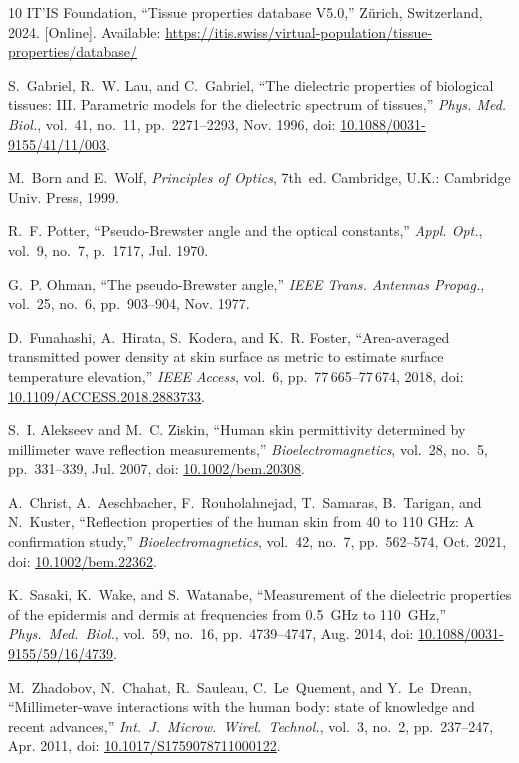 \documentclass[journal,twocolumn,10pt]{IEEEtran}
\newcommand*{\doi}[1]{\href{https://doi.org/#1}{#1}}
\theoremstyle{plain}
\theoremstyle{remark}
\begin{document}
\begin{thebibliography}{10}
IT'IS Foundation, ``Tissue properties database V5.0,'' Z\"urich,
  Switzerland, 2024. [Online]. Available:
  \url{https://itis.swiss/virtual-population/tissue-properties/database/}

S.~Gabriel, R.~W. Lau, and C.~Gabriel, ``The dielectric properties of
  biological tissues: III. Parametric models for the dielectric spectrum
  of tissues,'' \emph{Phys. Med. Biol.}, vol.~41, no.~11,
  pp.~2271--2293, Nov. 1996, doi: \doi{10.1088/0031-9155/41/11/003}.

M.~Born and E.~Wolf, \emph{Principles of Optics}, 7th~ed.
  Cambridge, U.K.: Cambridge Univ. Press, 1999.

R.~F. Potter, ``Pseudo-Brewster angle and the optical constants,''
  \emph{Appl. Opt.}, vol.~9, no.~7, p.~1717, Jul. 1970.

G.~P. Ohman, ``The pseudo-Brewster angle,'' \emph{IEEE Trans. Antennas
  Propag.}, vol.~25, no.~6, pp.~903--904, Nov. 1977.

D.~Funahashi, A.~Hirata, S.~Kodera, and K.~R. Foster, ``Area-averaged
  transmitted power density at skin surface as metric to estimate
  surface temperature elevation,'' \emph{IEEE Access}, vol.~6,
  pp.~77\,665--77\,674, 2018,
  doi: \doi{10.1109/ACCESS.2018.2883733}.

S.~I. Alekseev and M.~C. Ziskin, ``Human skin permittivity determined
  by millimeter wave reflection measurements,''
  \emph{Bioelectromagnetics}, vol.~28, no.~5, pp.~331--339, Jul. 2007,
  doi: \doi{10.1002/bem.20308}.

A.~Christ, A.~Aeschbacher, F.~Rouholahnejad, T.~Samaras, B.~Tarigan,
  and N.~Kuster, ``Reflection properties of the human skin from 40 to
  110 GHz: A confirmation study,'' \emph{Bioelectromagnetics},
  vol.~42, no.~7, pp.~562--574, Oct. 2021,
  doi: \doi{10.1002/bem.22362}.

K.~Sasaki, K.~Wake, and S.~Watanabe, ``Measurement of the dielectric
  properties of the epidermis and dermis at frequencies from 0.5~GHz
  to 110~GHz,'' \emph{Phys.\ Med.\ Biol.}, vol.~59, no.~16,
  pp.~4739--4747, Aug. 2014,
  doi: \doi{10.1088/0031-9155/59/16/4739}.

M.~Zhadobov, N.~Chahat, R.~Sauleau, C.~Le~Quement, and Y.~Le~Drean,
  ``Millimeter-wave interactions with the human body: state of
  knowledge and recent advances,'' \emph{Int.\ J.\ Microw.\ Wirel.\
  Technol.}, vol.~3, no.~2, pp.~237--247, Apr. 2011,
  doi: \doi{10.1017/S1759078711000122}.


\end{thebibliography}
\end{document}
